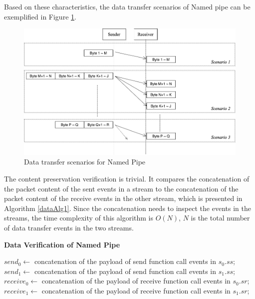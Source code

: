 Based on these characteristics, the data transfer scenarios of Named pipe can be exemplified in Figure \ref{namedpipe}. 
\begin{figure}[H]
\centerline{\includegraphics[scale=0.4]{Figures/namedpipe}}
\caption{Data transfer scenarios for Named Pipe}
\label{namedpipe}
\end{figure}

The content preservation verification is trivial. It compares the concatenation of the packet content of the sent events in a stream to the concatenation of the packet content of the receive events in the other stream, which is presented in Algorithm \ref{dataAlg1}. Since the concatenation needs to inspect the events in the streams, the time complexity of this algorithm is $O(N)$, $N$ is the total number of data transfer events in the two streams.

\begin{algorithm}[H]
\DontPrintSemicolon
\caption{{\bf Data Verification of Named Pipe} \label{dataAlg1}}
\;
$send_0 \leftarrow$ concatenation of the payload of send function call events in $s_0.ss$;\;
$send_1 \leftarrow$ concatenation of the payload of send function call events in $s_1.ss$;\;
$receive_0 \leftarrow$ concatenation of the payload of receive function call events in $s_0.sr$;\;
$receive_1 \leftarrow$ concatenation of the payload of receive function call events in $s_1.sr$;\;
\end{algorithm} 

